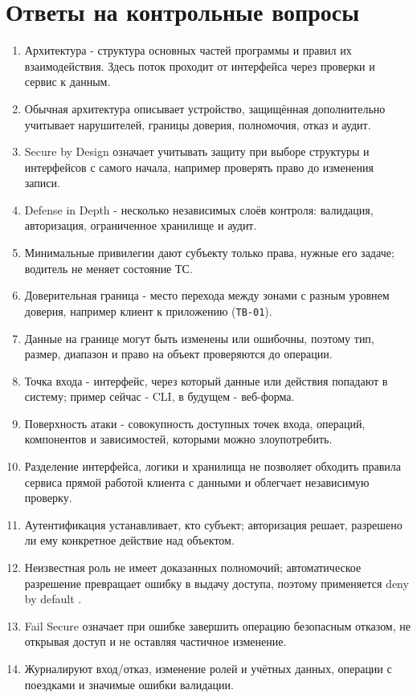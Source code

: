 \documentclass[12pt,a4paper]{article}
\begin{document}
\section{Ответы на контрольные вопросы}
\begin{enumerate}
\item Архитектура - структура основных частей программы и правил их взаимодействия. Здесь поток проходит от интерфейса через проверки и сервис к данным.
\item Обычная архитектура описывает устройство, защищённая дополнительно учитывает нарушителей, границы доверия, полномочия, отказ и аудит.
\item Secure by Design означает учитывать защиту при выборе структуры и интерфейсов с самого начала, например проверять право до изменения записи.
\item Defense in Depth - несколько независимых слоёв контроля: валидация, авторизация, ограниченное хранилище и аудит.
\item Минимальные привилегии дают субъекту только права, нужные его задаче; водитель не меняет состояние ТС.
\item Доверительная граница - место перехода между зонами с разным уровнем доверия, например клиент к приложению (\texttt{TB-01}).
\item Данные на границе могут быть изменены или ошибочны, поэтому тип, размер, диапазон и право на объект проверяются до операции.
\item Точка входа - интерфейс, через который данные или действия попадают в систему; пример сейчас - CLI, в будущем - веб-форма.
\item Поверхность атаки - совокупность доступных точек входа, операций, компонентов и зависимостей, которыми можно злоупотребить.
\item Разделение интерфейса, логики и хранилища не позволяет обходить правила сервиса прямой работой клиента с данными и облегчает независимую проверку.
\item Аутентификация устанавливает, кто субъект; авторизация решает, разрешено ли ему конкретное действие над объектом.
\item Неизвестная роль не имеет доказанных полномочий; автоматическое разрешение превращает ошибку в выдачу доступа, поэтому применяется deny by default \cite{owasp-asvs,owasp-auth}.
\item Fail Secure означает при ошибке завершить операцию безопасным отказом, не открывая доступ и не оставляя частичное изменение.
\item Журналируют вход/отказ, изменение ролей и учётных данных, операции с поездками и значимые ошибки валидации.

\end{enumerate}
\end{document}
